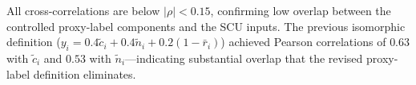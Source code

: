 \documentclass[a4paper,fleqn]{cas-sc}
\begin{document}
All cross-correlations are below $|\rho| < 0.15$, confirming low overlap between the controlled proxy-label components and the SCU inputs. The previous isomorphic definition ($y_i = 0.4\tilde{c}_i + 0.4\tilde{n}_i + 0.2(1-\bar{r}_i)$) achieved Pearson correlations of $0.63$ with $\tilde{c}_i$ and $0.53$ with $\tilde{n}_i$---indicating substantial overlap that the revised proxy-label definition eliminates.




\end{document}
